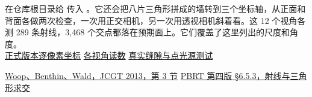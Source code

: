 在仓库根目录给  传入 。它还会把八片三角形拼成的墙转到三个坐标轴，从正面和背面各做两次检查，一次用正交相机，另一次用透视相机斜着看。这 12 个视角各测 289 条射线，3,468 个交点都落在预期面上。它们覆盖了这里列出的尺度和角度。\\
\href{run:../profiling/emissive-gi/edge-final.csv}{正式版本逐像素坐标}\quad
\href{run:../profiling/emissive-gi/edge-directions.csv}{各视角读数}\quad
\href{run:../../tests/TriangleIntersectionCheck.h}{真实缝隙与点光源测试}

\noindent\href{https://jcgt.org/published/0002/01/05/paper.pdf}{Woop、Benthin、Wald，JCGT 2013，第 3 节}\quad
\href{https://pbr-book.org/4ed/Shapes/Triangle_Meshes#TriangleIntersection}{PBRT 第四版 §6.5.3，射线与三角形求交}
